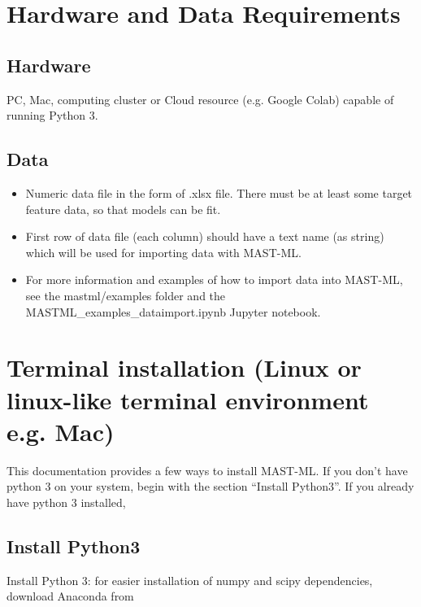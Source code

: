 \documentclass[letterpaper,10pt,english]{sphinxmanual}
\begin{document}
\section{Hardware and Data Requirements}
\label{\detokenize{0_1_hardware_data_requirements:hardware-and-data-requirements}}\label{\detokenize{0_1_hardware_data_requirements::doc}}

\subsection{Hardware}
\label{\detokenize{0_1_hardware_data_requirements:hardware}}
PC, Mac, computing cluster or Cloud resource (e.g. Google Colab) capable of running Python 3.


\subsection{Data}
\label{\detokenize{0_1_hardware_data_requirements:data}}\begin{itemize}
\item {} 
Numeric data file in the form of .xlsx file. There must be at least some target feature data, so that models can be fit.

\item {} 
First row of data file (each column) should have a text name (as string) which will be used for importing data with MAST-ML.

\item {} 
For more information and examples of how to import data into MAST-ML, see the mastml/examples folder and the MASTML\_examples\_dataimport.ipynb Jupyter notebook.

\end{itemize}


\section{Terminal installation (Linux or linux-like terminal environment e.g. Mac)}
\label{\detokenize{0_1_terminal_installation:terminal-installation-linux-or-linux-like-terminal-environment-e-g-mac}}\label{\detokenize{0_1_terminal_installation::doc}}
This documentation provides a few ways to install MAST-ML. If you don’t have python 3 on your system, begin
with the section “Install Python3”. If you already have python 3 installed,


\subsection{Install Python3}
\label{\detokenize{0_1_terminal_installation:install-python3}}
Install Python 3: for easier installation of numpy and scipy dependencies,
download Anaconda from 
\end{document}
